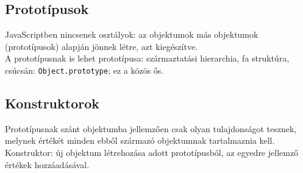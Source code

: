 \subsection{Prototípusok}

\begin{frame}
    JavaScriptben nincsenek osztályok: az objektumok más objektumok (prototípusok) alapján jönnek létre, azt kiegészítve.\\
    A prototípusnak is lehet prototípusa: származtatási hierarchia, fa struktúra, csúcsán: \texttt{Object.prototype}; ez a közös ős.
    \begin{exampleblock}{}
        \scriptsize
        
    \end{exampleblock}
\end{frame}

\begin{frame}
    \begin{exampleblock}{}
        
    \end{exampleblock}
\end{frame}

\begin{frame}
    \scriptsize
    \begin{exampleblock}{}
        \scriptsize
        \vspace{-.3cm}
        
        \vspace{-.3cm}
    \end{exampleblock}
\end{frame}

\subsection{Konstruktorok}

\begin{frame}
    \footnotesize
    Prototípusnak szánt objektumba jellemzően csak olyan tulajdonságot tesznek, melynek értékét minden ebből 
    származó objektumnak tartalmaznia kell. \\
    Konstruktor: új objektum létrehozása adott prototípusból,
    az egyedre jellemző értékek hozzáadásával.
    \begin{exampleblock}{}
        \scriptsize
        \vspace{-.2cm}
        
        \vspace{-.2cm}
    \end{exampleblock}
\end{frame}

